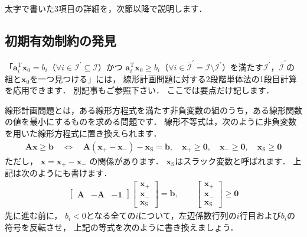 ﻿\documentclass{jsarticle}
\begin{document}
太字で書いた3項目の詳細を，次節以降で説明します．

\subsection{初期有効制約の発見}

「$\boldsymbol{a}_{i}^{\mathrm{T}}\boldsymbol{x}_{0}=b_{i}$（$\forall i\in\mathcal{I}^{\prime}\subseteq\mathcal{I}$）かつ
$\boldsymbol{a}_{i}^{\mathrm{T}}\boldsymbol{x}_{0}\geq b_{i}$（$\forall i\in\bar{\mathcal{I}}^{\prime}=\mathcal{I}\setminus\mathcal{I}^{\prime}$）を満たす$\mathcal{I}^{\prime}$，$\bar{\mathcal{I}}^{\prime}$の組と$\boldsymbol{x}_{0}$を一つ見つける」には，
線形計画問題に対する2段階単体法の1段目計算を応用できます．
別記事もご参照下さい．
ここでは要点だけ記します．

線形計画問題とは，ある線形方程式を満たす非負変数の組のうち，ある線形関数の値を最小にするものを求める問題です．
線形不等式は，次のように非負変数を用いた線形方程式に置き換えられます．
\begin{align*}
\boldsymbol{A}\boldsymbol{x}\geq\boldsymbol{b}
\quad\Leftrightarrow\quad
\boldsymbol{A}(\boldsymbol{x}_{+}-\boldsymbol{x}_{-})-\boldsymbol{x}_{\mathrm{S}}=\boldsymbol{b}
,\quad
\boldsymbol{x}_{+}\geq\boldsymbol{0},\quad
\boldsymbol{x}_{-}\geq\boldsymbol{0},\quad
\boldsymbol{x}_{\mathrm{S}}\geq\boldsymbol{0}
\end{align*}
ただし，
$\boldsymbol{x}=\boldsymbol{x}_{+}-\boldsymbol{x}_{-}$
の関係があります．
$\boldsymbol{x}_{\mathrm{S}}$はスラック変数と呼ばれます．
上記は次のようにも書けます．
\begin{align*}
\begin{bmatrix}
\boldsymbol{A} & -\boldsymbol{A} & -\boldsymbol{1}
\end{bmatrix}
\begin{bmatrix}
\boldsymbol{x}_{+} \\ \boldsymbol{x}_{-} \\ \boldsymbol{x}_{\mathrm{S}}
\end{bmatrix}
=
\boldsymbol{b}
,\qquad
\begin{bmatrix}
\boldsymbol{x}_{+} \\ \boldsymbol{x}_{-} \\ \boldsymbol{x}_{\mathrm{S}}
\end{bmatrix}
\geq\boldsymbol{0}
\end{align*}
先に進む前に，
$b_{i}<0$となる全ての$i$について，左辺係数行列の$i$行目および$b_{i}$の符号を反転させ，
上記の等式を次のように書き換えましょう．
\end{document}
